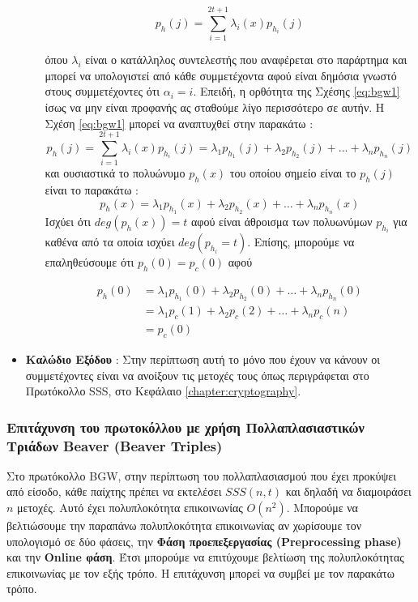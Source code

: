 \begin{itemize}
\begin{itemize}
            
            \begin{equation}\label{eq:bgw1}
            p_h(j) = \sum_{i=1}^{2t+1}λ_i(x)p_{h_i}(j)
            \end{equation}
            
            όπου $λ_i$ είναι ο κατάλληλος συντελεστής που αναφέρεται στο παράρτημα και μπορεί να υπολογιστεί από κάθε συμμετέχοντα αφού είναι δημόσια γνωστό στους συμμετέχοντες ότι $α_i=i$. Επειδή, η ορθότητα της Σχέσης \ref{eq:bgw1} ίσως να μην είναι προφανής ας σταθούμε λίγο περισσότερο σε αυτήν. Η Σχέση \ref{eq:bgw1} μπορεί να αναπτυχθεί στην παρακάτω :
            $$            
                 p_h(j) = \sum_{i=1}^{2t+1}λ_i(x)p_{h_i}(j) = λ_1p_{h_1}(j) + λ_2p_{h_2}(j) + \ldots + λ_n p_{h_n}(j)
            $$
            και ουσιαστικά το πολυώνυμο $p_h(x)$ του οποίου σημείο είναι το $p_h(j)$ είναι το παρακάτω : 
            $$
                p_h(x) = λ_1p_{h_1}(x) + λ_2p_{h_2}(x) + \ldots + λ_n p_{h_n}(x)
            $$
            Ισχύει ότι $deg(p_h(x))=t$ αφού είναι άθροισμα των πολυωνύμων $p_{h_i}$ για καθένα από τα οποία ισχύει $deg(p_{h_i} = t)$. Επίσης, μπορούμε να επαληθεύσουμε ότι $p_h(0)=p_c(0)$ αφού
            
            \begin{align}
                p_h(0) &= λ_1 p_{h_1}(0) + λ_2 p_{h_2}(0) + \ldots + λ_n p_{h_n}(0) \\
                &= λ_1 p_c(1) + λ_2 p_c(2) + \ldots + λ_n p_c(n) \\
                &= p_c(0)
            \end{align}
        \end{itemize}
    \item \textbf{Καλώδιο Εξόδου} : Στην περίπτωση αυτή το μόνο που έχουν να κάνουν οι συμμετέχοντες είναι να ανοίξουν τις μετοχές τους όπως περιγράφεται στο Πρωτόκολλο SSS, στο Κεφάλαιο \ref{chapter:cryptography}.
\end{itemize}

\subsubsection{Επιτάχυνση του πρωτοκόλλου με χρήση Πολλαπλασιαστικών Τριάδων Beaver (Beaver Triples)}
Στο πρωτόκολλο BGW, στην περίπτωση του πολλαπλασιασμού που έχει προκύψει από είσοδο, κάθε παίχτης πρέπει να εκτελέσει $SSS(n,t)$ και δηλαδή να διαμοιράσει $n$ μετοχές. Αυτό έχει πολυπλοκότητα επικοινωνίας $O(n^2)$. Μπορούμε να βελτιώσουμε την παραπάνω πολυπλοκότητα επικοινωνίας αν χωρίσουμε τον υπολογισμό σε δύο φάσεις, την \textbf{Φάση προεπεξεργασίας (Preprocessing phase)} και την \textbf{Online φάση}. Έτσι μπορούμε να επιτύχουμε βελτίωση της πολυπλοκότητας επικοινωνίας με τον εξής τρόπο. Η επιτάχυνση μπορεί να συμβεί με τον παρακάτω τρόπο.

